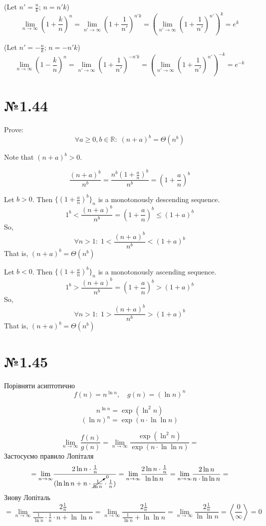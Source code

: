 \documentclass[11pt, a4paper]{article} %
\begin{document}
(Let $n' = \frac{n}{k}$; $n = n'k$)
$$\underset{n\to\infty}{\lim}\left(1+\frac{k}{n}\right)^n =
\underset{n'\to\infty}{\lim}\left(1+\frac{1}{n'}\right)^{n'k} = 
\left(\underset{n'\to\infty}{\lim}\left(1+\frac{1}{n'}\right)^{n'}\right)^k = e^k$$

(Let $n' = -\frac{n}{k}$; $n = -n'k$)
$$\underset{n\to\infty}{\lim}\left(1-\frac{k}{n}\right)^n = 
\underset{n'\to\infty}{\lim}\left(1+\frac{1}{n'}\right)^{-n'k} = 
\left(\underset{n'\to\infty}{\lim}\left(1+\frac{1}{n'}\right)^{n'}\right)^{-k} = e^{-k}$$

\pagebreak
\section*{№1.44}
\begin{mdframed}
    Prove:
    $$\forall a\ge 0,b\in\mathbb{R}:\; (n+a)^b = \Theta(n^b)$$
\end{mdframed}

Note that $(n+a)^b > 0$.

$$\frac{(n+a)^b}{n^b} = \frac{n^b (1+\frac{a}{n})^b}{n^b} = (1 + \frac{a}{n})^b$$

Let $b>0$. Then $\{(1+\frac{a}{n})^b\}_n$ is a monotonously descending sequence.
$$1^b < \frac{(n+a)^b}{n^b} = (1+\frac{a}{n})^b \le (1+a)^b$$
So, 
$$\forall n>1:\; 1 < \frac{(n+a)^b}{n^b} < (1+a)^b$$
That is, $(n+a)^b = \Theta(n^b)$

Let $b<0$. Then $\{(1+\frac{a}{n})^b\}_n$ is a monotonously ascending sequence.
$$1^b > \frac{(n+a)^b}{n^b} = (1+\frac{a}{n})^b > (1+a)^b$$
So, 
$$\forall n>1:\; 1 > \frac{(n+a)^b}{n^b} > (1+a)^b$$
That is, $(n+a)^b = \Theta(n^b)$

\section*{№1.45}
\begin{mdframed}
    Порівняти асиптотично
    $$f(n) = n^{\ln n},\quad g(n) = (\ln n)^n$$
\end{mdframed}

$$n^{\ln n} = \exp(\ln^2 n)$$
$$(\ln n)^n = \exp(n \cdot \ln \ln n)$$

$$
\underset{n\to\infty}{\lim}\frac{f(n)}{g(n)} = \underset{n\to\infty}{\lim}\frac{\exp(\ln^2 n)}{\exp(n \cdot \ln \ln n)} = $$
Застосуємо правило Лопіталя
$$= \underset{n\to\infty}{\lim}\frac{2\ln n \cdot \frac{1}{n}}{(\ln \ln n + n \cdot \cancelto{0}{\frac{1}{\ln n}} \cdot \frac{1}{n} )}
= \underset{n\to\infty}{\lim}\frac{2\ln n \cdot \frac{1}{n}}{\ln \ln n}
= \underset{n\to\infty}{\lim}\frac{2\ln n}{n\cdot \ln \ln n} =
$$
Знову Лопіталь
$$
= \underset{n\to\infty}{\lim}\frac{2\frac{1}{n}}{\frac{1}{\ln n} \cdot \frac{1}{n}\cdot n + \ln \ln n}
= \underset{n\to\infty}{\lim}\frac{2 \frac{1}{n}}{\frac{1}{\ln n}+\ln \ln n}
= \underset{n\to\infty}{\lim}\frac{2 \frac{1}{n}}{\ln \ln n} = \left< \frac{0}{\infty} \right> = 0
$$
\end{document}
